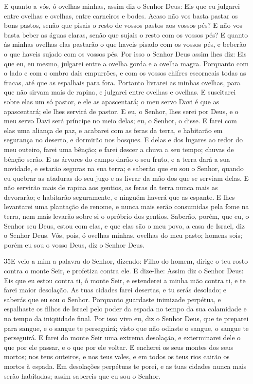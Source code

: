 E quanto a vós, ó ovelhas minhas, assim diz o Senhor Deus: Eis
que eu julgarei entre ovelhas e ovelhas, entre carneiros e bodes.
Acaso não vos basta pastar os bons pastos, senão que pisais o
resto de vossos pastos aos vossos pés? E não vos basta beber as
águas claras, senão que sujais o resto com os vossos pés? E
quanto às minhas ovelhas elas pastarão o que haveis pisado com os
vossos pés, e beberão o que haveis sujado com os vossos pés.
Por isso o Senhor Deus assim lhes diz: Eis que eu, eu mesmo,
julgarei entre a ovelha gorda e a ovelha magra. Porquanto com
o lado e com o ombro dais empurrões, e com os vossos chifres
escorneais todas as fracas, até que as espalhais para fora.
Portanto livrarei as minhas ovelhas, para que não sirvam mais
de rapina, e julgarei entre ovelhas e ovelhas. E suscitarei
sobre elas um só pastor, e ele as apascentará; o meu servo Davi é
que as apascentará; ele lhes servirá de pastor. E eu, o
Senhor, lhes serei por Deus, e o meu servo Davi será príncipe no
meio delas; eu, o Senhor, o disse. E farei com elas uma
aliança de paz, e acabarei com as feras da terra, e habitarão em
segurança no deserto, e dormirão nos bosques. E delas e dos
lugares ao redor do meu outeiro, farei uma bênção; e farei descer a
chuva a seu tempo; chuvas de bênção serão. E as árvores do
campo darão o seu fruto, e a terra dará a sua novidade, e estarão
seguras na sua terra; e saberão que eu sou o Senhor, quando eu
quebrar as ataduras do seu jugo e as livrar da mão dos que se
serviam delas. E não servirão mais de rapina aos gentios, as
feras da terra nunca mais as devorarão; e habitarão seguramente, e
ninguém haverá que as espante. E lhes levantarei uma
plantação de renome, e nunca mais serão consumidas pela fome na
terra, nem mais levarão sobre si o opróbrio dos gentios.
Saberão, porém, que eu, o Senhor seu Deus, estou com elas, e
que elas são o meu povo, a casa de Israel, diz o Senhor Deus.
Vós, pois, ó ovelhas minhas, ovelhas do meu pasto; homens
sois; porém eu sou o vosso Deus, diz o Senhor Deus.

\medskip

\lettrine{35} E veio a mim a palavra do Senhor, dizendo:
Filho do homem, dirige o teu rosto contra o monte Seir, e
profetiza contra ele. E dize-lhe: Assim diz o Senhor Deus: Eis
que eu estou contra ti, ó monte Seir, e estenderei a minha mão
contra ti, e te farei maior desolação. As tuas cidades farei
desertas, e tu serás desolado; e saberás que eu sou o Senhor.
Porquanto guardaste inimizade perpétua, e espalhaste os filhos
de Israel pelo poder da espada no tempo da sua calamidade e no tempo
da iniqüidade final. Por isso vivo eu, diz o Senhor Deus, que te
preparei para sangue, e o sangue te perseguirá; visto que não
odiaste o sangue, o sangue te perseguirá. E farei do monte Seir
uma extrema desolação, e exterminarei dele o que por ele passar, e o
que por ele voltar. E encherei os seus montes dos seus mortos;
nos teus outeiros, e nos teus vales, e em todos os teus rios cairão
os mortos à espada. Em desolações perpétuas te porei, e as tuas
cidades nunca mais serão habitadas; assim sabereis que eu sou o
Senhor.


